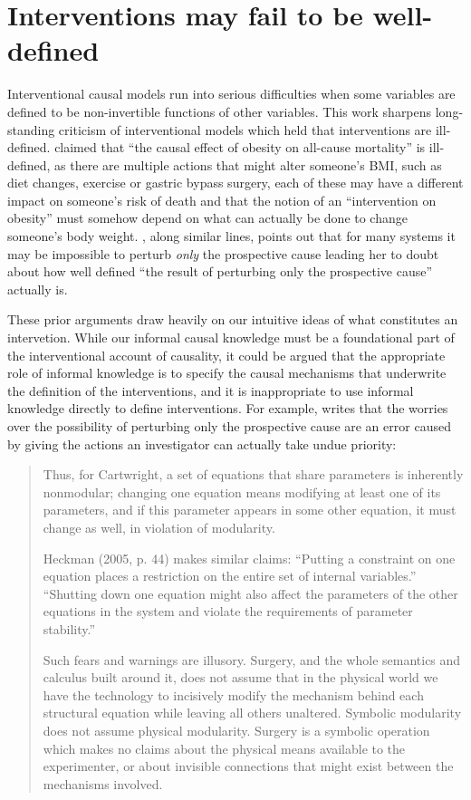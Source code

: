 

\section{Interventions may fail to be well-defined}

Interventional causal models run into serious difficulties when some variables are defined to be non-invertible functions of other variables. This work sharpens long-standing criticism of interventional models which held that interventions are ill-defined. \cite{hernan_does_2008} claimed that ``the causal effect of obesity on all-cause mortality'' is ill-defined, as there are multiple actions that might alter someone's BMI, such as diet changes, exercise or gastric bypass surgery, each of these may have a different impact on someone's risk of death and that the notion of an ``intervention on obesity'' must somehow depend on what can actually be done to change someone's body weight. \cite{cartwright_modularity_2001}, along similar lines, points out that for many systems it may be impossible to perturb \emph{only} the prospective cause leading her to doubt about how well defined ``the result of perturbing only the prospective cause'' actually is.

These prior arguments draw heavily on our intuitive ideas of what constitutes an intervetion. While our informal causal knowledge must be a foundational part of the interventional account of causality, it could be argued that the appropriate role of informal knowledge is to specify the causal mechanisms that underwrite the definition of the interventions, and it is inappropriate to use informal knowledge directly to define interventions. For example, \citet{pearl_causality:_2009} writes that the worries over the possibility of perturbing only the prospective cause are an error caused by giving the actions an investigator can actually take undue priority:
\begin{quote}
Thus, for Cartwright, a set of equations that share parameters is inherently nonmodular; changing one equation means modifying at least one of its parameters, and if this parameter appears in some other equation, it must change as well, in violation of modularity. 

Heckman (2005, p. 44) makes similar claims: “Putting a constraint on one equation places a restriction on the entire set of internal variables.” “Shutting down one equation might also affect the parameters of the other equations in the system and violate the requirements of parameter stability.”

Such fears and warnings are illusory. Surgery, and the whole semantics and calculus built around it, does not assume that in the physical world we have the technology to incisively modify the mechanism behind each structural equation while leaving all others unaltered. Symbolic modularity does not assume physical modularity. Surgery is a symbolic operation which makes no claims about the physical means available to the experimenter, or about invisible connections that might exist between the mechanisms involved.
\end{quote}


